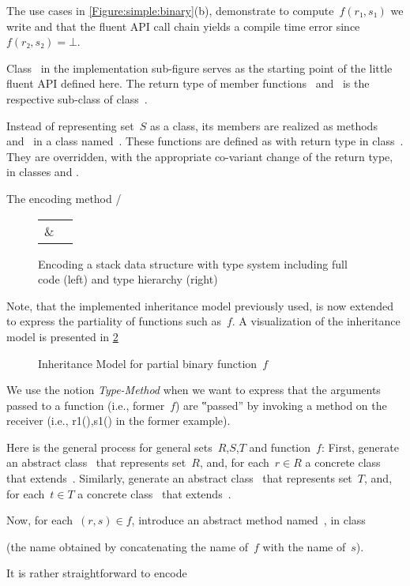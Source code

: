 The use cases in \cref{Figure:simple:binary}(b), demonstrate
  to compute~$f(r₁,s₁)$ we write 
  and that the fluent API call chain  yields
  a compile time error since~$f(r₂, s₂)=⊥$.

Class~ in the implementation sub-figure serves as
  the starting point of the little fluent API defined here.
The return type of  member functions~ and~
is the respective sub-class of class~.

Instead of representing set~$S$ as a class,
  its members are realized as methods~ and~ in a class
  named~.
These functions are defined as  with return type 
  in class~.
They are overridden, with the appropriate co-variant change of the return type,
  in classes  and .

The encoding method /

\begin{figure}[h]
    \caption{Encoding a stack data structure with
    \Java type system including full code (left) and type hierarchy (right)}\label{Figure:stack:encoding}
    \begin{tabular}{cc}
         \parbox[c]{0.74\linewidth}{
      }
        &
         \parbox[c]{\hsize}{
          
        }
    \end{tabular}
\end{figure}
      Note, that the implemented inheritance model previously used, is now extended to express the partiality
        of functions such as~$f$. A visualization of the inheritance model is presented in \cref{Figure:partial:inheritance:model}

\begin{figure}[ht]
  \label{Figure:partial:inheritance:model}
  \caption{Inheritance Model for partial binary function~$f$}
  \begin{adjustbox}{max width=0.6\linewidth}
    
  \end{adjustbox}
\end{figure}

We use the notion \emph{Type-Method} when we want to express that the arguments passed to a function
  (i.e., former~$f$) are ‟passed” by invoking a method on the receiver (i.e., r1(),s1() in the former example).

Here is the general process for general sets~$R$,$S$,$T$ and function~$f$:
First, generate an abstract class~ that represents set~$R$, and,
  for each~$r∈R$ a concrete class~ that extends~.
Similarly, generate an abstract class~ that represents set~$T$, and,
  for each~$t∈T$ a concrete class~ that extends~.

Now, for each~$(r,s)∈f$, introduce an abstract method named~,
  in class~

(the name obtained by
  concatenating the name of~$f$ with the name of~$s$).

It is rather straightforward to encode
